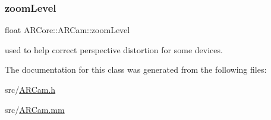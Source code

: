\subsubsection{\texorpdfstring{zoom\+Level}{zoomLevel}}
{\footnotesize\ttfamily float A\+R\+Core\+::\+A\+R\+Cam\+::zoom\+Level}



used to help correct perspective distortion for some devices. 



The documentation for this class was generated from the following files\+:\begin{DoxyCompactItemize}
\item 
src/\hyperlink{_a_r_cam_8h}{A\+R\+Cam.\+h}\item 
src/\hyperlink{_a_r_cam_8mm}{A\+R\+Cam.\+mm}\end{DoxyCompactItemize}
